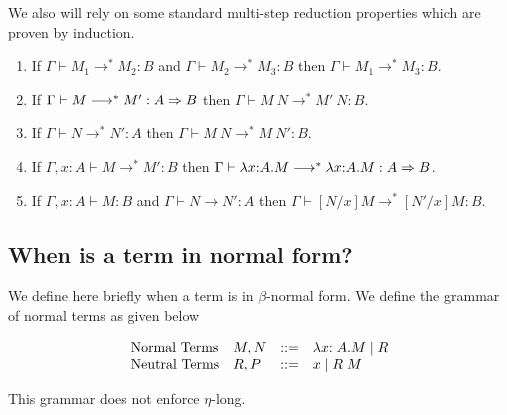 \documentclass{article}
\newcommand{\mred}{\longrightarrow^*}
\newcommand{\red}{\longrightarrow}
\begin{document}
We also will rely on some standard multi-step reduction properties which are proven by induction.

\begin{lemma}\label{lm:mredprop}
\quad
\begin{enumerate}
\item\label{lm:mredtrans} If $\Gamma \vdash M_1 \mred M_2 : B$ and $\Gamma \vdash M_2 \mred M_3 : B$ then $\Gamma \vdash M_1 \mred M_3 : B$.
\item\label{lm:mredappl} If $\Gamma \vdash M \mred M' : A \arrow B$ then $\Gamma \vdash M~N \mred M'~N : B$.
\item\label{lm:mredappr} If $\Gamma \vdash N \mred N' : A$ then $\Gamma \vdash M~N \mred M~N' : B$.
\item\label{lm:mredabs} If $\Gamma,x{:}A \vdash M \mred M' : B$ then $\Gamma \vdash \lambda x{:}A.M \mred \lambda x{:}A.M : A \arrow B$.
\item\label{lm:mredsubs} If $\Gamma, x{:}A \vdash M : B$ and $\Gamma \vdash N \red N' : A$
then $\Gamma \vdash [N/x]M \mred [N'/x]M : B$.
\end{enumerate}  
\end{lemma}



\subsection*{When is a term in normal form?}

We define here briefly when a term is in $\beta$-normal form.
We define the grammar of normal terms as given below

\[
\begin{array}{llcl}
\mbox{Normal Terms}  & M,N & \mathrel{::=} & \lambda x{:A}. M \mid R \\
\mbox{Neutral Terms} & R, P & \mathrel{::=} & x \mid R\;M \\
  \end{array}
\]

This grammar does not enforce $\eta$-long.
\end{document}
